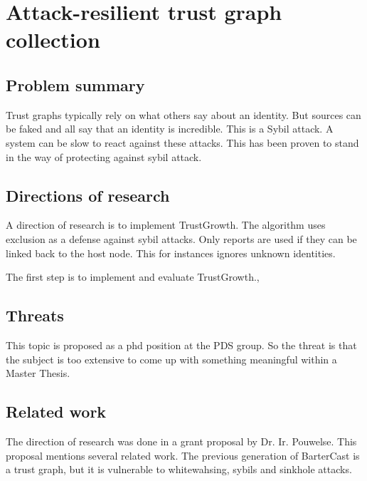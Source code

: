 \section{Attack-resilient trust graph collection}

\subsection*{Problem summary}
Trust graphs typically rely on what others say about an identity.
But sources can be faked and all say that an identity is incredible.
This is a Sybil attack.
A system can be slow to react against these attacks.
This has been proven to stand in the way of protecting against sybil attack.

\subsection*{Directions of research}
A direction of research is to implement TrustGrowth.
The algorithm uses exclusion as a defense against sybil attacks.
Only reports are used if they can be linked back to the host node.
This for instances ignores unknown identities.

The first step is to implement and evaluate TrustGrowth.,

\subsection*{Threats}
This topic is proposed as a phd position at the PDS group.
So the threat is that the subject is too extensive to come up with something meaningful within a Master Thesis.

\subsection*{Related work}
The direction of research was done in a grant proposal by Dr. Ir. Pouwelse.
This proposal mentions several related work.
The previous generation of BarterCast is a trust graph, but it is vulnerable to whitewahsing, sybils and sinkhole attacks.


